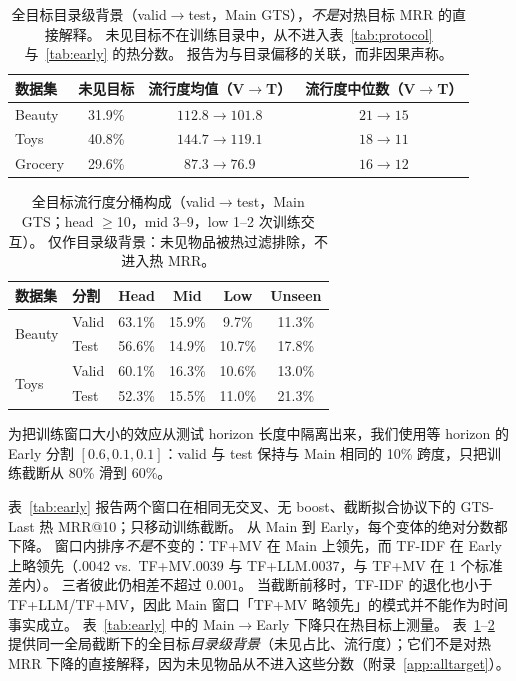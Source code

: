 \documentclass[sigconf,natbib=true,anonymous]{acmart}
\newcommand{\tfidf}{\textsc{TF-IDF}\xspace}
\newcommand{\tfllm}{\textsc{TF+LLM}\xspace}
\newcommand{\tfmv}{\textsc{TF+MV}\xspace}
\begin{document}
\begin{table}[t]
\centering
\caption{%
全目标目录级背景（valid$\to$test，Main GTS），\emph{不是}对热目标 MRR 的直接解释。
未见目标不在训练目录中，从不进入表~\ref{tab:protocol} 与~\ref{tab:early} 的热分数。
报告为与目录偏移的关联，而非因果声称。%
}
\label{tab:shift}
\small
\setlength{\tabcolsep}{4pt}
\begin{tabular}{@{}lccc@{}}
\toprule
数据集 & 未见目标 & 流行度均值（V$\to$T） & 流行度中位数（V$\to$T） \\
\midrule
Beauty  & 31.9\% & $112.8 \to 101.8$ & $21 \to 15$ \\
Toys    & 40.8\% & $144.7 \to 119.1$ & $18 \to 11$ \\
Grocery & 29.6\% & $87.3 \to 76.9$ & $16 \to 12$ \\
\bottomrule
\end{tabular}
\end{table}

\begin{table}[t]
\centering
\caption{%
全目标流行度分桶构成（valid$\to$test，Main GTS；head $\ge$10，mid 3--9，low 1--2 次训练交互）。
仅作目录级背景：未见物品被热过滤排除，不进入热 MRR。%
}
\label{tab:bucket}
\small
\setlength{\tabcolsep}{3.5pt}
\begin{tabular}{@{}llcccc@{}}
\toprule
数据集 & 分割 & Head & Mid & Low & Unseen \\
\midrule
\multirow{2}{*}{Beauty}
 & Valid & 63.1\% & 15.9\% & 9.7\% & 11.3\% \\
 & Test  & 56.6\% & 14.9\% & 10.7\% & 17.8\% \\
\midrule
\multirow{2}{*}{Toys}
 & Valid & 60.1\% & 16.3\% & 10.6\% & 13.0\% \\
 & Test  & 52.3\% & 15.5\% & 11.0\% & 21.3\% \\
\bottomrule
\end{tabular}
\end{table}

为把训练窗口大小的效应从测试 horizon 长度中隔离出来，我们使用等 horizon 的 Early 分割 $[0.6, 0.1, 0.1]$：valid 与 test 保持与 Main 相同的 10\% 跨度，只把训练截断从 80\% 滑到 60\%。

表~\ref{tab:early} 报告两个窗口在相同无交叉、无 boost、截断拟合协议下的 GTS-Last 热 MRR@10；只移动训练截断。
从 Main 到 Early，每个变体的绝对分数都下降。
窗口内排序\emph{不是}不变的：\tfmv 在 Main 上领先，而 \tfidf 在 Early 上略领先（$.0042$ vs.\ \tfmv $.0039$ 与 \tfllm $.0037$，与 \tfmv 在 1 个标准差内）。
三者彼此仍相差不超过 $0.001$。
当截断前移时，\tfidf 的退化也小于 \tfllm/\tfmv，因此 Main 窗口「\tfmv 略领先」的模式并不能作为时间事实成立。
表~\ref{tab:early} 中的 Main$\to$Early 下降只在热目标上测量。
表~\ref{tab:shift}--\ref{tab:bucket} 提供同一全局截断下的全目标\emph{目录级背景}（未见占比、流行度）；它们不是对热 MRR 下降的直接解释，因为未见物品从不进入这些分数（附录~\ref{app:alltarget}）。
\end{document}

